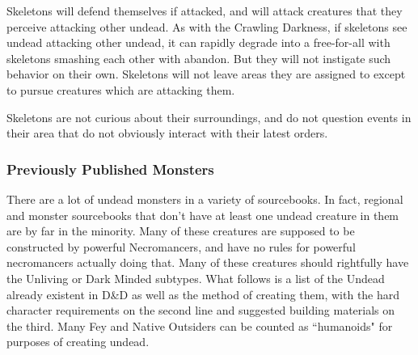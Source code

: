 Skeletons will defend themselves if attacked, and will attack creatures that they perceive attacking other undead. As with the Crawling Darkness, if skeletons see undead attacking other undead, it can rapidly degrade into a free-for-all with skeletons smashing each other with abandon. But they will not instigate such behavior on their own. Skeletons will not leave areas they are assigned to except to pursue creatures which are attacking them.

Skeletons are not curious about their surroundings, and do not question events in their area that do not obviously interact with their latest orders.

\subsubsection{Previously Published Monsters}

There are a lot of undead monsters in a variety of sourcebooks. In fact, regional and monster sourcebooks that don't have at least one undead creature in them are by far in the minority. Many of these creatures are supposed to be constructed by powerful Necromancers, and have no rules for powerful necromancers actually doing that. Many of these creatures should rightfully have the Unliving or Dark Minded subtypes. What follows is a list of the Undead already existent in D\&D as well as the method of creating them, with the hard character requirements on the second line and suggested building materials on the third. Many Fey and Native Outsiders can be counted as ``humanoids" for purposes of creating undead.

